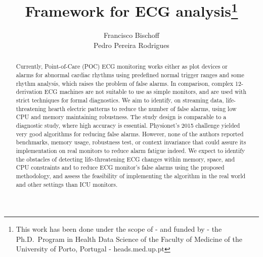\documentclass[runningheads]{llncs}
\begin{document}
%
\title{Framework for ECG analysis\thanks{This work has been done under
the scope of - and funded by - the Ph.D.~Program in Health Data Science
of the Faculty of Medicine of the University of Porto, Portugal -
heads.med.up.pt}}
%
%
%
\author{  Francisco Bischoff\\  Pedro Pereira Rodrigues }

%


\maketitle              %
%

\begin{abstract}
  Currently, Point-of-Care (POC) ECG monitoring works either as plot
  devices or alarms for abnormal cardiac rhythms using predefined normal
  trigger ranges and some rhythm analysis, which raises the problem of
  false alarms. In comparison, complex 12-derivation ECG machines are
  not suitable to use as simple monitors, and are used with strict
  techniques for formal diagnostics. We aim to identify, on streaming
  data, life-threatening hearth electric patterns to reduce the number
  of false alarms, using low CPU and memory maintaining robustness. The
  study design is comparable to a diagnostic study, where high accuracy
  is essential. Physionet's 2015 challenge yielded very good algorithms
  for reducing false alarms. However, none of the authors reported
  benchmarks, memory usage, robustness test, or context invariance that
  could assure its implementation on real monitors to reduce alarm
  fatigue indeed. We expect to identify the obstacles of detecting
  life-threatening ECG changes within memory, space, and CPU constraints
  and to reduce ECG monitor's false alarms using the proposed
  methodology, and assess the feasibility of implementing the algorithm
  in the real world and other settings than ICU monitors.


\end{abstract}
%
%
\end{document}
